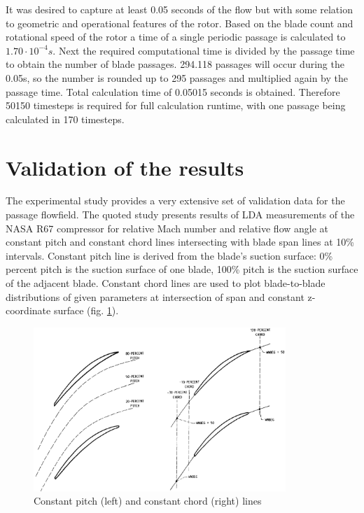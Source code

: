 It was desired to capture at least 0.05 seconds of the flow but with some relation to geometric and operational features of the rotor. Based on the blade count and rotational speed of the rotor a time of a single periodic passage is calculated to $1.70 \cdot 10^{-4}s$. Next the required computational time is divided by the passage time to obtain the number of blade passages. 294.118 passages will occur during the 0.05s, so the number is rounded up to 295 passages and multiplied again by the passage time. Total calculation time of 0.05015 seconds is obtained. Therefore 50150 timesteps is required for full calculation runtime, with one passage being calculated in 170 timesteps.

\section{Validation of the results}
The experimental study \citep{r67laser} provides a very extensive set of validation data for the passage flowfield. The quoted study presents results of LDA measurements of the NASA R67 compressor for relative Mach number and relative flow angle at constant pitch and constant chord lines intersecting with blade span lines at 10\% intervals. Constant pitch line is derived from the blade's suction surface: 0\% percent pitch is the suction surface of one blade, 100\% pitch is the suction surface of the adjacent blade. Constant chord lines are used to plot blade-to-blade distributions of given parameters at intersection of span and constant z-coordinate surface (fig. \ref{fig_LA}).

\begin{figure}[h!]
\centering %
\includegraphics[width=0.85\textwidth]{Pictures/LA.png}
\caption{Constant pitch (left) and constant chord (right) lines \citep{r67laser}}
\label{fig_LA}
\end{figure}

